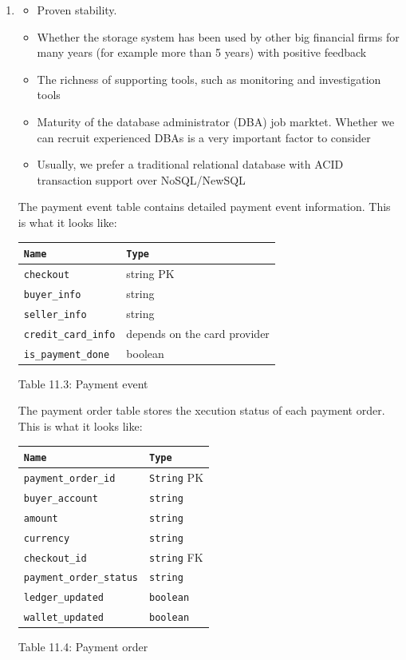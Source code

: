 \documentclass{report}
\theoremstyle{definition}
\begin{document}
\begin{enumerate}
\item

\begin{itemize}
\item
Proven stability.
\item
Whether the storage system has been used by other big financial firms for many years (for example more than 5 years) with positive feedback
\item
The richness of supporting tools, such as monitoring and investigation tools
\item
Maturity of the database administrator (DBA) job marktet. Whether we can recruit experienced DBAs is a very important factor to consider
\item
Usually, we prefer a traditional relational database with ACID transaction support over NoSQL/NewSQL
\end{itemize}

The payment event table contains detailed payment event information. This is what it looks like:

\begin{tabular}{|p{6cm}|p{6cm}|}
\hline
\lstinline|Name| & \lstinline|Type| \\
\hline
\lstinline|checkout| & string PK \\
\hline
\lstinline|buyer_info| & string \\
\hline
\lstinline|seller_info| & string \\
\hline
\lstinline|credit_card_info| & depends on the card provider \\
\hline
\lstinline|is_payment_done| & boolean \\
\end{tabular}

Table 11.3: Payment event

The payment order table stores the xecution status of each payment order. This is what it looks like:

\begin{tabular}{|p{6cm}|p{6cm}|}
\hline
\lstinline|Name| & \lstinline|Type| \\
\hline
\lstinline|payment_order_id| & \lstinline|String| PK \\
\hline
\lstinline|buyer_account| & \lstinline|string| \\
\hline
\lstinline|amount| & \lstinline|string| \\
\hline
\lstinline|currency| & \lstinline|string| \\
\hline
\lstinline|checkout_id| & \lstinline|string| FK \\
\hline
\lstinline|payment_order_status| & \lstinline|string| \\
\hline
\lstinline|ledger_updated| & \lstinline|boolean| \\
\hline
\lstinline|wallet_updated| & \lstinline|boolean| \\
\hline
\end{tabular}

Table 11.4: Payment order
\end{enumerate}
\end{document}
